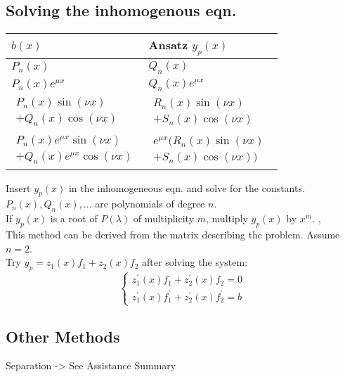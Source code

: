 \subsection{Solving the inhomogenous eqn.}
\Procedure[Ansatz]
\begin{table}[H]
  \begin{center}
    \begin{tabular}{l|l}
      $b(x)$ & Ansatz $y_p(x)$ \\
      \hline
      
      $P_n(x)$ & $Q_n(x)$ \\
      $P_n(x)e^{\mu x}$ & $Q_n(x)e^{\mu x}$\\
      \hline
      
      $\begin{matrix}
      P_n(x) \sin(\nu x) \\ + 
      Q_n(x)\cos(\nu x)
      \end{matrix}$ 
      & $\begin{matrix}R_n(x)\sin(\nu x)\qquad\\ 
      + S_n(x)\cos(\nu x)\end{matrix}$ \\
      \hline
      
      $\begin{matrix}P_n(x)e^{\mu x}\sin(\nu x) \\
       + Q_n(x)e^{\mu x}\cos(\nu x)\end{matrix} $
      & $\begin{matrix}e^{\mu x}(R_n(x)\sin(\nu x) \\ + S_n(x)\cos(\nu x))\end{matrix}$
    \end{tabular}
  \end{center}
\end{table}
Insert $y_p(x)$ in the inhomogeneous eqn. and solve for the constants. $P_n(x), Q_n(x), \dots$ are polynomials of degree $n$. \\
\Remark If $y_p(x)$ is a root of $P(\lambda)$ of multiplicity $m$, multiply $y_p(x)$ by $x^m$.
\sep
{} \\
This method can be derived from the matrix describing the problem. Assume $n=2$. \\
Try $y_p = z_{1}(x) f_{1}+z_{2}(x)f_{2}$ after solving the system:
$$
\left\{\begin{array}{l}
z_{1}^{\prime}(x) f_{1}+z_{2}^{\prime}(x) f_{2}=0 \\
z_{1}^{\prime}(x) f_{1}^{\prime}+z_{2}^{\prime}(x) f_{2}^{\prime}=b
\end{array}\right.
$$

\subsection{Other Methods}
Separation -> See Assistance Summary